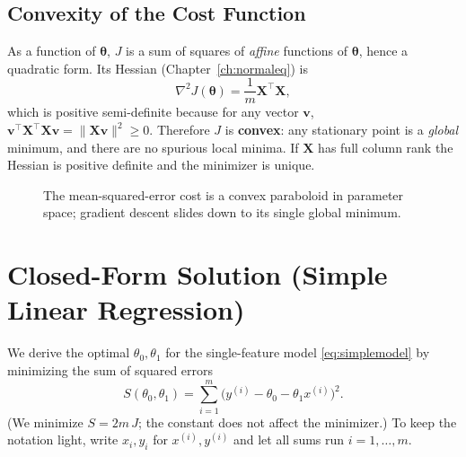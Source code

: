 \documentclass[11pt,a4paper]{report}
\theoremstyle{definition}
\theoremstyle{plain}
\theoremstyle{remark}
\newcommand{\vw}{\bm{\theta}}          %
\newcommand{\Xmat}{\mathbf{X}}
\begin{document}
	\section{Convexity of the Cost Function}
	\label{sec:convex}
	As a function of $\vw$, $J$ is a sum of squares of \emph{affine} functions of
	$\vw$, hence a quadratic form. Its Hessian (Chapter~\ref{ch:normaleq}) is
	\[
	\nabla^2 J(\vw)=\frac1m\Xmat^{\!\top}\Xmat ,
	\]
	which is positive semi-definite because for any vector $\mathbf{v}$,
	$\mathbf{v}^{\!\top}\Xmat^{\!\top}\Xmat\mathbf{v}=\|\Xmat\mathbf{v}\|^2\ge0$.
	Therefore $J$ is \textbf{convex}: any stationary point is a \emph{global}
	minimum, and there are no spurious local minima. If $\Xmat$ has full column
	rank the Hessian is positive definite and the minimizer is unique.
	
	\begin{figure}[ht]
		\centering
		\caption{The mean-squared-error cost is a convex paraboloid in parameter
			space; gradient descent slides down to its single global minimum.}
		\label{fig:bowl}
	\end{figure}
	
	\chapter{Closed-Form Solution (Simple Linear Regression)}
	\label{ch:closedform}
	
	We derive the optimal $\theta_0,\theta_1$ for the single-feature model
	\eqref{eq:simplemodel} by minimizing the sum of squared errors
	\begin{equation}
		S(\theta_0,\theta_1)=\sum_{i=1}^{m}\bigl(y^{(i)}-\theta_0-\theta_1 x^{(i)}\bigr)^2 .
		\label{eq:SSE}
	\end{equation}
	(We minimize $S=2m\,J$; the constant does not affect the minimizer.) To keep
	the notation light, write $x_i,y_i$ for $x^{(i)},y^{(i)}$ and let all sums run
	$i=1,\dots,m$.
	
\end{document}
